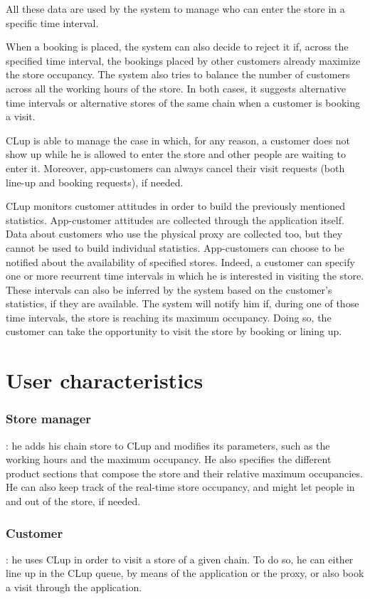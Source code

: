 \documentclass[a4paper,oneside,11pt]{book}   %
\begin{document}
    All these data are used by the system to manage who can enter the store in a specific time interval. \par
    When a booking is placed, the system can also decide to reject it if, across the specified time interval, the bookings placed by other customers already maximize the store occupancy. The system also tries to balance the number of customers across all the working hours of the store. In both cases, it suggests alternative time intervals or alternative stores of the same chain when a customer is booking a visit. \par
    CLup is able to manage the case in which, for any reason, a customer does not show up while he is allowed to enter the store and other people are waiting to enter it. Moreover, app-customers can always cancel their visit requests (both line-up and booking requests), if needed. \par
    CLup monitors customer attitudes in order to build the previously mentioned statistics. App-customer attitudes are collected through the application itself. Data about customers who use the physical proxy are collected too, but they cannot be used to build individual statistics.
    App-customers can choose to be notified about the availability of specified stores. Indeed, a customer can specify one or more recurrent time intervals in which he is interested in visiting the store. These intervals can also be inferred by the system based on the customer’s statistics, if they are available. The system will notify him if, during one of those time intervals, the store is reaching its maximum occupancy. Doing so, the customer can take the opportunity to visit the store by booking or lining up.

    \section{User characteristics}
    \subsubsection{Store manager}: he adds his chain store to CLup and modifies its parameters, such as the working hours and the maximum occupancy. He also specifies the different product sections that compose the store and their relative maximum occupancies. He can also keep track of the real-time store occupancy, and might let people in and out of the store, if needed.
    \subsubsection{Customer}: he uses CLup in order to visit a store of a given chain. To do so, he can either line up in the CLup queue, by means of the application or the proxy, or also book a visit through the application. 
\end{document}
